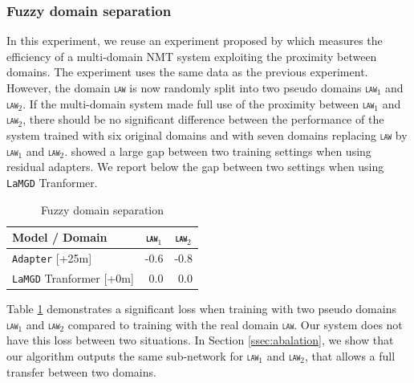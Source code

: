 \documentclass[11pt]{article}
\newcommand{\domain}[1]{\texttt{\textsc{#1}}}
\newcommand{\system}[1]{\texttt{{#1}}}
\begin{document}
\subsubsection{Fuzzy domain separation}
\label{ssec:fuzzy}
In this experiment, we reuse an experiment proposed by \citet{Pham21revisiting} which measures the efficiency of a multi-domain NMT system exploiting the proximity between domains. The experiment uses the same data as the previous experiment. However, the domain \domain{law} is now randomly split into two pseudo domains \domain{law$_1$} and \domain{law$_2$}. If the multi-domain system made full use of the proximity between \domain{law$_1$} and \domain{law$_2$}, there should be no significant difference between the performance of the system trained with six original domains and with seven domains replacing \domain{law} by \domain{law$_1$} and \domain{law$_2$}. \citet{Pham21revisiting} showed a large gap between two training settings when using residual adapters. We report below the gap between two settings when using \system{LaMGD} Tranformer. 

\begin{table}[h!]
  \centering
  \begin{tabular}{|p{4cm}|*{2}{r|}} \hline
    Model / Domain & \multicolumn{1}{c|}{\domain{law$_1$}} & \multicolumn{1}{c|}{\domain{law$_2$}} \\ \hline 
    \system{Adapter}   \hfill{\footnotesize[+25m]}  & -0.6 & -0.8 \\ 
    \system{LaMGD} Tranformer   \hfill{\footnotesize[+0m]}  & 0.0 & 0.0 \\ 
    \hline
  \end{tabular}
  \caption{Fuzzy domain separation}
  \label{tab:fuzzy}
\end{table}

Table \ref{tab:fuzzy} demonstrates a significant loss when training with two pseudo domains \domain{law$_1$} and \domain{law$_2$} compared to training with the real domain \domain{law}. Our system does not have this loss between two situations. In Section \ref{ssec:abalation}, we show that our algorithm outputs the same sub-network for \domain{law$_1$} and \domain{law$_2$}, that allows a full transfer between two domains.
\end{document}
